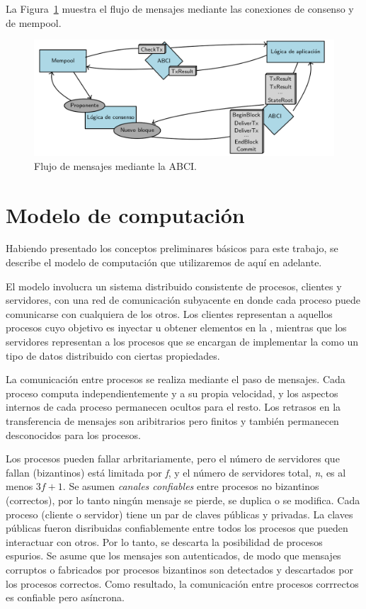 La Figura~\ref{fig:abci_flow} muestra el flujo de mensajes mediante las conexiones de consenso y de mempool.

\begin{figure}
  \centering
  \includegraphics[scale=0.35]{figures/abci_msg_flow.png}
  \caption{Flujo de mensajes mediante la ABCI.}
  \label{fig:abci_flow}
\end{figure}

\section{Modelo de computación}
Habiendo presentado los conceptos preliminares básicos para este trabajo, se describe
el modelo de computación que utilizaremos de aquí en adelante.

El modelo involucra un sistema distribuido consistente de procesos, clientes y servidores, con una
red de comunicación subyacente en donde cada proceso puede comunicarse con cualquiera de los otros.
Los clientes representan a aquellos procesos cuyo objetivo es inyectar u obtener elementos en la \setchain,
mientras que los servidores representan a los procesos que se encargan de implementar la \setchain
como un tipo de datos distribuido con ciertas propiedades.

La comunicación entre procesos se realiza mediante el paso de mensajes.
Cada proceso computa independientemente y a su propia velocidad, y los aspectos internos de cada proceso
permanecen ocultos para el resto. Los retrasos en la transferencia de mensajes son aribitrarios pero finitos
y también permanecen desconocidos para los procesos.

Los procesos pueden fallar arbritariamente, pero el número de servidores que fallan (bizantinos) está
limitada por \textit{f}, y el número de servidores total, \textit{n}, es al menos $3f + 1$.
Se asumen \textit{canales confiables} entre procesos no bizantinos (correctos), por lo tanto ningún
mensaje se pierde, se duplica o se modifica.
Cada proceso (cliente o servidor) tiene un par de claves públicas y privadas.
La claves públicas fueron disribuidas confiablemente entre todos los procesos que pueden interactuar
con otros.
Por lo tanto, se descarta la posibilidad de procesos espurios.
Se asume que los mensajes son autenticados, de modo que mensajes corruptos o fabricados por
procesos bizantinos son detectados y descartados por los procesos correctos.
Como resultado, la comunicación entre procesos corrrectos es confiable pero asíncrona.

